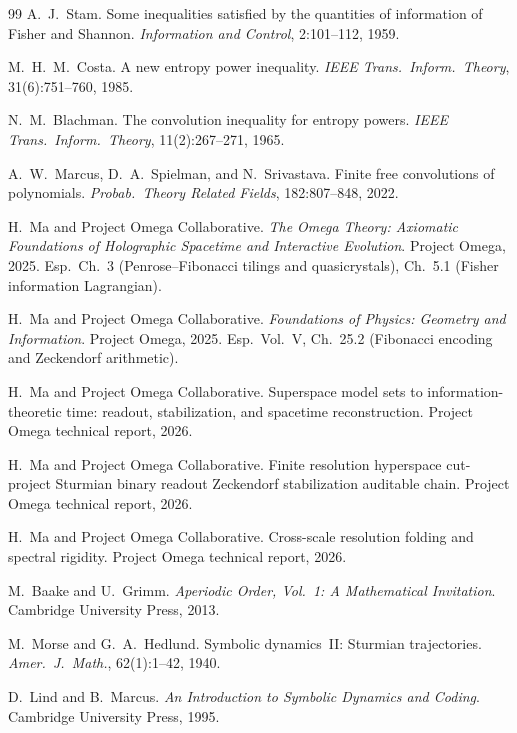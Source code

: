 \documentclass[11pt]{article}
\theoremstyle{definition}
\theoremstyle{remark}
\begin{document}
\begin{thebibliography}{99}
A.~J.~Stam.
\newblock Some inequalities satisfied by the quantities of information of
  Fisher and Shannon.
\newblock \emph{Information and Control}, 2:101--112, 1959.

M.~H.~M.~Costa.
\newblock A new entropy power inequality.
\newblock \emph{IEEE Trans.\ Inform.\ Theory}, 31(6):751--760, 1985.

N.~M.~Blachman.
\newblock The convolution inequality for entropy powers.
\newblock \emph{IEEE Trans.\ Inform.\ Theory}, 11(2):267--271, 1965.

A.~W.~Marcus, D.~A.~Spielman, and N.~Srivastava.
\newblock Finite free convolutions of polynomials.
\newblock \emph{Probab.\ Theory Related Fields}, 182:807--848, 2022.


H.~Ma and {Project Omega Collaborative}.
\newblock \emph{The Omega Theory: Axiomatic Foundations of Holographic
  Spacetime and Interactive Evolution}.
\newblock Project Omega, 2025.
\newblock Esp.\ Ch.~3 (Penrose--Fibonacci tilings and quasicrystals),
  Ch.~5.1 (Fisher information Lagrangian).

H.~Ma and {Project Omega Collaborative}.
\newblock \emph{Foundations of Physics: Geometry and Information}.
\newblock Project Omega, 2025.
\newblock Esp.\ Vol.~V, Ch.~25.2 (Fibonacci encoding and Zeckendorf arithmetic).

H.~Ma and {Project Omega Collaborative}.
\newblock Superspace model sets to information-theoretic time: readout,
  stabilization, and spacetime reconstruction.
\newblock Project Omega technical report, 2026.

H.~Ma and {Project Omega Collaborative}.
\newblock Finite resolution hyperspace cut-project Sturmian binary readout
  Zeckendorf stabilization auditable chain.
\newblock Project Omega technical report, 2026.

H.~Ma and {Project Omega Collaborative}.
\newblock Cross-scale resolution folding and spectral rigidity.
\newblock Project Omega technical report, 2026.


M.~Baake and U.~Grimm.
\newblock \emph{Aperiodic Order, Vol.~1: A Mathematical Invitation}.
\newblock Cambridge University Press, 2013.

M.~Morse and G.~A.~Hedlund.
\newblock Symbolic dynamics~{II}: {S}turmian trajectories.
\newblock \emph{Amer.\ J.\ Math.}, 62(1):1--42, 1940.

D.~Lind and B.~Marcus.
\newblock \emph{An Introduction to Symbolic Dynamics and Coding}.
\newblock Cambridge University Press, 1995.

\end{thebibliography}
\end{document}
